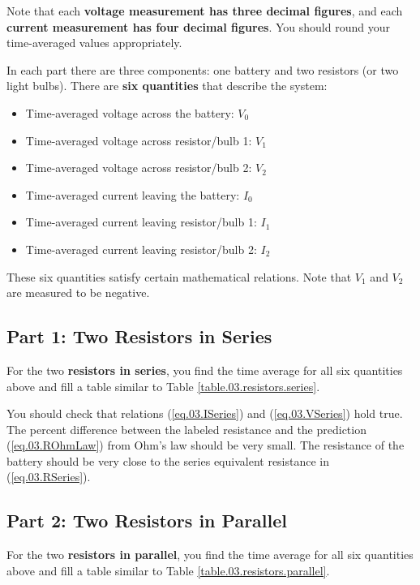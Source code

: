 Note that each \textbf{voltage measurement has three decimal figures}, and each \textbf{current measurement has four decimal figures}. You should round your time-averaged values appropriately.

In each part there are three components: one battery and two resistors (or two light bulbs). There are \textbf{six quantities} that describe the system:
\begin{itemize}
	\item Time-averaged voltage across the battery: $V_{0}$
	\item Time-averaged voltage across resistor/bulb 1: $V_{1}$
	\item Time-averaged voltage across resistor/bulb 2: $V_{2}$
	\item Time-averaged current leaving the battery: $I_{0}$
	\item Time-averaged current leaving resistor/bulb 1: $I_{1}$
	\item Time-averaged current leaving resistor/bulb 2: $I_{2}$
\end{itemize}
These six quantities satisfy certain mathematical relations. Note that $V_{1}$ and $V_{2}$ are measured to be negative.
\subsection{Part 1: Two Resistors in Series}
For the two \textbf{resistors in series}, you find the time average for all six quantities above and fill a table similar to Table \ref{table.03.resistors.series}.

You should check that relations (\ref{eq.03.ISeries}) and (\ref{eq.03.VSeries}) hold true. The percent difference between the labeled resistance and the prediction (\ref{eq.03.ROhmLaw}) from Ohm's law should be very small. The resistance of the battery should be very close to the series equivalent resistance in (\ref{eq.03.RSeries}).
\subsection{Part 2: Two Resistors in Parallel}
For the two \textbf{resistors in parallel}, you find the time average for all six quantities above and fill a table similar to Table \ref{table.03.resistors.parallel}.


